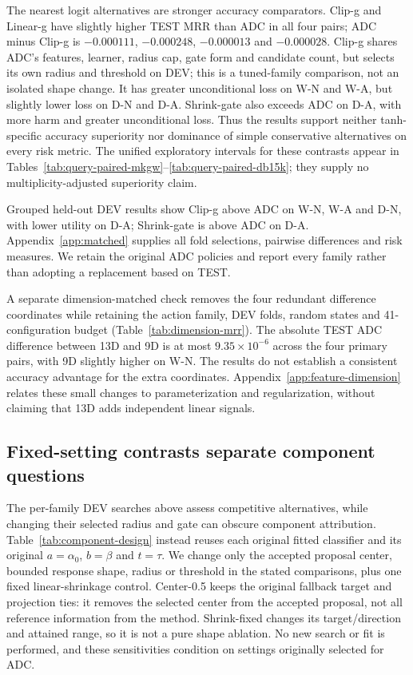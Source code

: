 \documentclass[11pt,a4paper]{article}
\begin{document}
The nearest logit alternatives are stronger accuracy comparators. Clip-g and Linear-g have slightly higher TEST MRR than ADC in all four pairs; ADC minus Clip-g is $-0.000111$, $-0.000248$, $-0.000013$ and $-0.000028$. Clip-g shares ADC's features, learner, radius cap, gate form and candidate count, but selects its own radius and threshold on DEV; this is a tuned-family comparison, not an isolated shape change. It has greater unconditional loss on W-N and W-A, but slightly lower loss on D-N and D-A. Shrink-gate also exceeds ADC on D-A, with more harm and greater unconditional loss. Thus the results support neither tanh-specific accuracy superiority nor dominance of simple conservative alternatives on every risk metric. The unified exploratory intervals for these contrasts appear in Tables~\ref{tab:query-paired-mkgw}--\ref{tab:query-paired-db15k}; they supply no multiplicity-adjusted superiority claim.

Grouped held-out DEV results show Clip-g above ADC on W-N, W-A and D-N, with lower utility on D-A; Shrink-gate is above ADC on D-A. Appendix~\ref{app:matched} supplies all fold selections, pairwise differences and risk measures. We retain the original ADC policies and report every family rather than adopting a replacement based on TEST.


A separate dimension-matched check removes the four redundant difference coordinates while retaining the action family, DEV folds, random states and 41-configuration budget (Table~\ref{tab:dimension-mrr}). The absolute TEST ADC difference between 13D and 9D is at most $9.35\times10^{-6}$ across the four primary pairs, with 9D slightly higher on W-N. The results do not establish a consistent accuracy advantage for the extra coordinates. Appendix~\ref{app:feature-dimension} relates these small changes to parameterization and regularization, without claiming that 13D adds independent linear signals.

\subsection{Fixed-setting contrasts separate component questions}
\label{sec:component-ablation}
The per-family DEV searches above assess competitive alternatives, while changing their selected radius and gate can obscure component attribution. Table~\ref{tab:component-design} instead reuses each original fitted classifier and its original $a=\alpha_0$, $b=\beta$ and $t=\tau$. We change only the accepted proposal center, bounded response shape, radius or threshold in the stated comparisons, plus one fixed linear-shrinkage control. Center-0.5 keeps the original fallback target and projection ties: it removes the selected center from the accepted proposal, not all reference information from the method. Shrink-fixed changes its target/direction and attained range, so it is not a pure shape ablation. No new search or fit is performed, and these sensitivities condition on settings originally selected for ADC.

\end{document}

